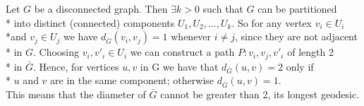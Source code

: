 Let $G$ be a disconnected graph. Then $\exists k > 0$ such that $G$ can be partitioned\\* into distinct (connected) components $U_1, U_2, \dots ,U_k$. So for any vertex $v_i \in U_i$ \\*and $v_j \in U_j$ we have $d_{\bar{G}}\left(v_i, v_j\right) = 1$  whenever $ i \neq j$, since they are not adjacent\\* in $G$. Choosing $v_i , v'_i \in U_i$ we can construct a path $P: v_i, v_j, v'_i$ of length 2\\* in $\bar{G}$. Hence, for vertices $u,v$ in G we have that $d_{\bar{G}}\left(u,v\right) = 2$  only if\\* $u$ and $v$ are in the same component;  otherwise $d_{\bar{G}}\left(u,v\right) = 1$.\\ This means that the diameter of $\bar{G}$ cannot be greater than 2, its longest geodesic.
